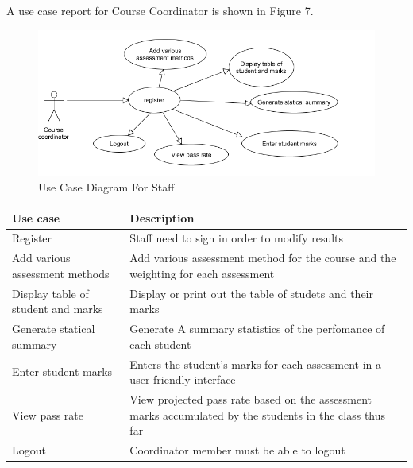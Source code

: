 	A use case report for Course Coordinator is shown in Figure 7.
	\begin{center}
		\begin{figure}[h]
			\centering
			\includegraphics[trim={0cm 0cm 0cm 0cm },clip,scale = 0.85]{CourseCoordinatorUsecase}
			\caption{Use Case Diagram For Staff}
		\end{figure}
	\end{center}
	
	
	
	\begin{center}
		\begin{tabular}{ | p{3cm} | p{10cm}| }
			\hline
			\textbf{Use case}& \textbf{Description} \\ \hline
			Register & Staff need to sign in order to modify results \\ \hline
			Add various assessment methods & Add various assessment method for the course and the weighting for each assessment  \\ \hline
			
			Display table of student and marks & Display or print out the table
of studets and their marks\\ \hline
            Generate statical summary & Generate A summary statistics of the perfomance of each student  \\ \hline
            Enter student marks & Enters the student's marks for each assessment in a user-friendly interface \\ \hline
            View pass rate & View projected pass rate based on the assessment marks accumulated by the students in the class thus far \\ \hline
			Logout          & Coordinator member must be able to logout  \\ \hline
			
		\end{tabular}
	\end{center}
	
